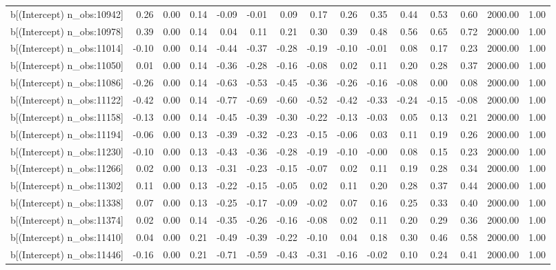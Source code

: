 \begin{table}[ht]
\begin{tabular}{rrrrrrrrrrrrrrr}
  b[(Intercept) n\_obs:10942] & 0.26 & 0.00 & 0.14 & -0.09 & -0.01 & 0.09 & 0.17 & 0.26 & 0.35 & 0.44 & 0.53 & 0.60 & 2000.00 & 1.00 \\ 
  b[(Intercept) n\_obs:10978] & 0.39 & 0.00 & 0.14 & 0.04 & 0.11 & 0.21 & 0.30 & 0.39 & 0.48 & 0.56 & 0.65 & 0.72 & 2000.00 & 1.00 \\ 
  b[(Intercept) n\_obs:11014] & -0.10 & 0.00 & 0.14 & -0.44 & -0.37 & -0.28 & -0.19 & -0.10 & -0.01 & 0.08 & 0.17 & 0.23 & 2000.00 & 1.00 \\ 
  b[(Intercept) n\_obs:11050] & 0.01 & 0.00 & 0.14 & -0.36 & -0.28 & -0.16 & -0.08 & 0.02 & 0.11 & 0.20 & 0.28 & 0.37 & 2000.00 & 1.00 \\ 
  b[(Intercept) n\_obs:11086] & -0.26 & 0.00 & 0.14 & -0.63 & -0.53 & -0.45 & -0.36 & -0.26 & -0.16 & -0.08 & 0.00 & 0.08 & 2000.00 & 1.00 \\ 
  b[(Intercept) n\_obs:11122] & -0.42 & 0.00 & 0.14 & -0.77 & -0.69 & -0.60 & -0.52 & -0.42 & -0.33 & -0.24 & -0.15 & -0.08 & 2000.00 & 1.00 \\ 
  b[(Intercept) n\_obs:11158] & -0.13 & 0.00 & 0.14 & -0.45 & -0.39 & -0.30 & -0.22 & -0.13 & -0.03 & 0.05 & 0.13 & 0.21 & 2000.00 & 1.00 \\ 
  b[(Intercept) n\_obs:11194] & -0.06 & 0.00 & 0.13 & -0.39 & -0.32 & -0.23 & -0.15 & -0.06 & 0.03 & 0.11 & 0.19 & 0.26 & 2000.00 & 1.00 \\ 
  b[(Intercept) n\_obs:11230] & -0.10 & 0.00 & 0.13 & -0.43 & -0.36 & -0.28 & -0.19 & -0.10 & -0.00 & 0.08 & 0.15 & 0.23 & 2000.00 & 1.00 \\ 
  b[(Intercept) n\_obs:11266] & 0.02 & 0.00 & 0.13 & -0.31 & -0.23 & -0.15 & -0.07 & 0.02 & 0.11 & 0.19 & 0.28 & 0.34 & 2000.00 & 1.00 \\ 
  b[(Intercept) n\_obs:11302] & 0.11 & 0.00 & 0.13 & -0.22 & -0.15 & -0.05 & 0.02 & 0.11 & 0.20 & 0.28 & 0.37 & 0.44 & 2000.00 & 1.00 \\ 
  b[(Intercept) n\_obs:11338] & 0.07 & 0.00 & 0.13 & -0.25 & -0.17 & -0.09 & -0.02 & 0.07 & 0.16 & 0.25 & 0.33 & 0.40 & 2000.00 & 1.00 \\ 
  b[(Intercept) n\_obs:11374] & 0.02 & 0.00 & 0.14 & -0.35 & -0.26 & -0.16 & -0.08 & 0.02 & 0.11 & 0.20 & 0.29 & 0.36 & 2000.00 & 1.00 \\ 
  b[(Intercept) n\_obs:11410] & 0.04 & 0.00 & 0.21 & -0.49 & -0.39 & -0.22 & -0.10 & 0.04 & 0.18 & 0.30 & 0.46 & 0.58 & 2000.00 & 1.00 \\ 
  b[(Intercept) n\_obs:11446] & -0.16 & 0.00 & 0.21 & -0.71 & -0.59 & -0.43 & -0.31 & -0.16 & -0.02 & 0.10 & 0.24 & 0.41 & 2000.00 & 1.00 \\ 

\end{tabular}
\end{table}
